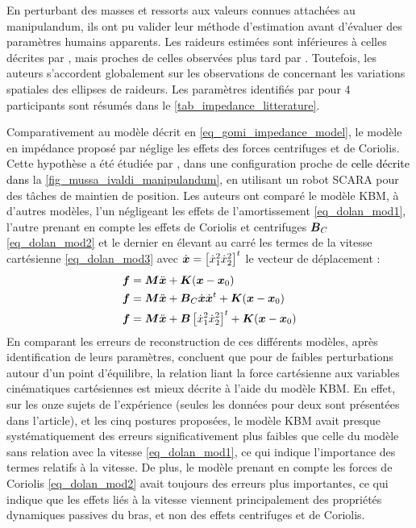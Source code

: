 En perturbant des masses et ressorts aux valeurs connues attachées au manipulandum, ils ont pu valider leur méthode d'estimation avant d'évaluer des paramètres humains apparents. Les raideurs estimées sont inférieures à celles décrites par \textcite{mussa-ivaldi_neural_1985}, mais proches de celles observées plus tard par \textcite{gomi_human_1997, gomi_task-dependent_1998}. Toutefois, les auteurs s'accordent globalement sur les observations de \textcite{mussa-ivaldi_neural_1985} concernant les variations spatiales des ellipses de raideurs. Les paramètres identifiés par \textcite{tsuji_human_1995} pour 4 participants sont résumés dans le \cref{tab_impedance_litterature}.

Comparativement au modèle décrit en \cref{eq_gomi_impedance_model}, le modèle en impédance proposé par \textcite{tsuji_human_1995} néglige les effets des forces centrifuges et de Coriolis. Cette hypothèse a été étudiée par \textcite{dolan_dynamic_1993}, dans une configuration proche de \textcolor{black}{celle décrite dans} la \cref{fig_mussa_ivaldi_manipulandum}, en utilisant un robot SCARA pour des tâches de maintien de position. Les auteurs ont comparé le modèle KBM, à d'autres modèles, l'un négligeant les effets de l'amortissement \cref{eq_dolan_mod1}, l'autre prenant en compte les effets de Coriolis et centrifuges $\matr{B}_C$ \cref{eq_dolan_mod2} et le dernier en élevant au carré les termes de la vitesse cartésienne \cref{eq_dolan_mod3} avec $ \dot{\vect{x}} = \left[ \dot{x}^2_1 \dot{x}^2_2 \right]^t $ le vecteur de déplacement :
%
\begin{subequations} 
	\begin{align}
		\vect{f} &= \matr{M}\ddot{\vect{x}} + \matr{K}(\vect{x} -\vect{x}_0) \label{eq_dolan_mod1} \\
		\vect{f} &= \matr{M}\ddot{\vect{x}} + \matr{B}_C\dot{\vect{x}}\dot{\vect{x}}^t + \matr{K}(\vect{x} -\vect{x}_0) \label{eq_dolan_mod2} \\
		\vect{f} &= \matr{M}\ddot{\vect{x}} + \matr{B}\left[\dot{x}^2_1 \dot{x}^2_2 \right]^t + \matr{K}(\vect{x} -\vect{x}_0) \label{eq_dolan_mod3}
	\end{align}	
\end{subequations}
%
En comparant les erreurs de reconstruction de ces différents modèles, après identification de leurs paramètres, \textcite{dolan_dynamic_1993} concluent que pour de faibles perturbations autour d'un point d'équilibre, la relation liant la force cartésienne aux variables cinématiques cartésiennes est mieux décrite à l'aide du modèle KBM. En effet, sur les onze sujets de l'expérience (seules les données pour deux sont présentées dans l'article), et les cinq postures proposées, le modèle KBM avait presque systématiquement des erreurs significativement plus faibles que celle du modèle sans relation avec la vitesse \cref{eq_dolan_mod1}, ce qui indique l'importance des termes relatifs à la vitesse. De plus, le modèle prenant en compte les forces de Coriolis \cref{eq_dolan_mod2} avait toujours des erreurs plus importantes, ce qui indique que les effets liés à la vitesse viennent principalement des propriétés dynamiques passives du bras, et non des effets centrifuges et de Coriolis.

